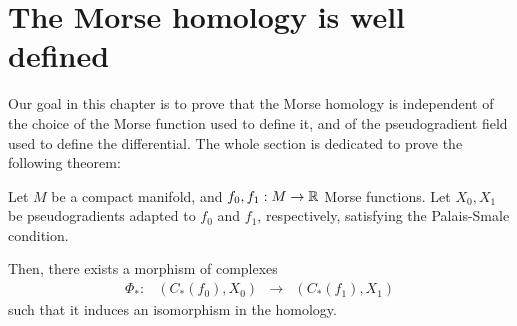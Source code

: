 \section{The Morse homology is well defined} \label{section:morse_well_defined}

Our goal in this chapter is to prove that the Morse homology is independent of the choice of the Morse function used to define it, and of the pseudogradient field used to define the differential. The whole section is dedicated to prove the following theorem:

\begin{theo}
Let $M$ be a compact manifold, and $f_0, f_1 : M \rightarrow \mathbb{R}$ Morse functions. Let $X_0, X_1$ be pseudogradients adapted to $f_0$ and $f_1$, respectively, satisfying the Palais-Smale condition.

Then, there exists a morphism of complexes
\begin{equation} \label{morphism}
\begin{array}{rccc} \Phi_{\ast} : & (C_{\ast}(f_0), X_0) & \longrightarrow & (C_{\ast}(f_1), X_1) \end{array}
\end{equation}
such that it induces an isomorphism in the homology.
\end{theo}

